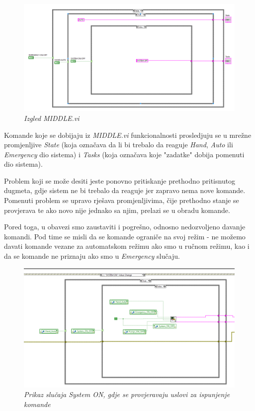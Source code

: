 \documentclass[12pt, titlepage]{article}
\begin{document}
            \begin{figure}[ht]
                \centering
                \includegraphics[width=\textwidth]{Slike/MIDDLE.vi CODE.png}
                \caption{\textit{Izgled MIDDLE.vi}}
            \end{figure}
            
            Komande koje se dobijaju iz \textit{MIDDLE.vi} funkcionalnosti prosledjuju se u 
            mrežne promjenljive \textit{State} (koja označava da li bi trebalo da reaguje 
            \textit{Hand}, \textit{Auto} ili \textit{Emergency} dio sistema) i \textit{Tasks} 
            (koja označava koje "zadatke" dobija pomenuti dio sistema).

            Problem koji se može desiti jeste ponovno pritiskanje prethodno pritisnutog dugmeta,
            gdje sistem ne bi trebalo da reaguje jer zapravo nema nove komande. Pomenuti problem se upravo 
            rješava promjenljivima, čije prethodno stanje se provjerava te ako novo nije jednako sa njim,
            prelazi se u obradu komande. 

            Pored toga, u obavezi smo zaustaviti i pogrešno, odnosno nedozvoljeno davanje komandi. 
            Pod time se misli da se komande ograniče na svoj režim - ne možemo davati komande 
            vezane za automatskom režimu ako smo u ručnom režimu, kao i da se komande ne priznaju ako
            smo u \textit{Emergency} slučaju. 

            \newpage

            \begin{figure}[ht]
                \centering 
                \includegraphics[width=\textwidth]{Slike/SCADA.vi SYSTEM ON CASE.png}
                \caption{\textit{Prikaz slučaja System ON, gdje se provjeravaju uslovi za ispunjenje komande}}
            \end{figure}
\end{document}
